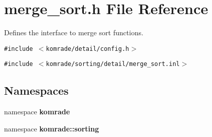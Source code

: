 \section{merge\_\-sort.h File Reference}
\label{merge__sort_8h}
Defines the interface to merge sort functions. 

{\tt \#include $<$komrade/detail/config.h$>$}\par
{\tt \#include $<$komrade/sorting/detail/merge\_\-sort.inl$>$}\par
\subsection*{Namespaces}
\begin{CompactItemize}
\item 
namespace {\bf komrade}
\item 
namespace {\bf komrade::sorting}
\end{CompactItemize}
